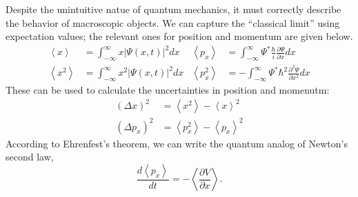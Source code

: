 \documentclass[../p052main.tex]{subfiles}
\begin{document}
\begin{summary}
    Despite the unintuitive natue of quantum mechanics, it must correctly describe the behavior of macroscopic objects.
    We can capture the ``classical limit'' using expectation values; the relevant ones for position and momentum are given below.
    \begin{align*}
        \left< x \right> &= \int_{-\infty}^{\infty} x |\Psi(x,t)|^2dx & \left< p_x \right> &= \int_{-\infty}^\infty \Psi^* \frac{\hbar}{i} \frac{\partial \Psi}{\partial x} dx \\
        \left< x^2 \right> &= \int_{-\infty}^{\infty} x^2 |\Psi(x,t)|^2dx & \left< p_x^2 \right> &= -\int_{-\infty}^\infty \Psi^* \hbar^2 \frac{\partial^2 \Psi}{\partial x^2} dx
    \end{align*}
    These can be used to calculate the uncertainties in position and momenutm:
    \begin{align*}
        (\Delta x)^2 &= \left< x^2 \right> - \left< x \right>^2 \\
        (\Delta p_x)^2 &= \left< p_x^2 \right> - \left< p_x \right>^2
    \end{align*}
    According to Ehrenfest's theorem, we can write the quantum analog of Newton's second law,
    \[ \frac{d \left< p_x \right>}{dt} = -\left< \frac{\partial V}{\partial x} \right>. \]
\end{summary}
\end{document}
